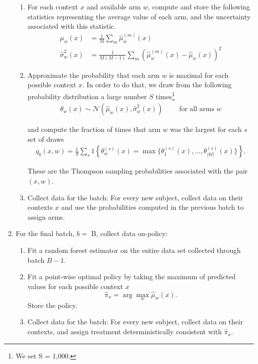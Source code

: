 \documentclass[letterpaper, 12pt, parskip=full,]{scrartcl}
\begin{document}
\begin{enumerate}
\begin{enumerate}
  \item For each context $x$ and available arm $w$, compute and store the following statistics representing the average value of each arm, and the uncertainty associated with this statistic.
    \begin{equation*}
      \begin{aligned}
        \hat{\mu}_w(x)         &= \frac{1}{M}\sum_{m} \hat{\mu}_w^{(m)}(x) \\
         \hat{\sigma}^{2}_w(x) &= \frac{1}{M(M-1)} \sum_{m} (\hat{\mu}_w^{(m)}(x) - \hat{\mu}_w(x))^2
      \end{aligned}
    \end{equation*}

  \item \label{step:prob} Approximate the probability that each arm $w$ is maximal for each possible context $x$. In order to do that, we draw from the following probability distribution a large number $S$ times\footnote{We set S = 1,000.}
  \begin{align*}
    \theta_{w}(x) \sim \mathcal{N}(\hat{\mu}_w(x), \hat{\sigma}_w^{2}(x)) \qquad %
    \text{ for all arms }w
  \end{align*}

  and compute the fraction of times that arm $w$ was the largest for each $s$ set of draws
  \begin{align*}
    q_{b}(x, w) = \frac{1}{S} \sum_{s} 1\left\{ \theta_{w}^{(s)}(x) = \max \{\theta_{1}^{(s)}(x), \dots, \theta_{|\mathcal{W}|}^{(s)}(x) \}  \right\}. 
  \end{align*}

  These are the Thompson sampling probabilities associated with the pair $(x, w)$. 
  
  \item Collect data for the batch: For every new subject, collect data on their contexts $x$ and use the probabilities computed in the previous batch to assign arms.
\end{enumerate}

\item For the final batch,  $b = $ B, collect data on-policy:
\begin{enumerate}
  \item Fit a random forest estimator on the entire data set collected through batch $B-1$.
  \item Fit a point-wise optimal policy  by taking the maximum of predicted values for each possible context $x$ 
    \begin{equation*}
     \hat{\pi}_{x} = \arg\max_{ w } \hat{\mu}_{w}(x) . 
    \end{equation*} 
  Store the policy. 
  \item Collect data for the batch: For every new subject, collect data on their contexts, and assign treatment deterministically consistent with $\hat{\pi}_{x}$. 
\end{enumerate}
\end{enumerate}
\end{document}
